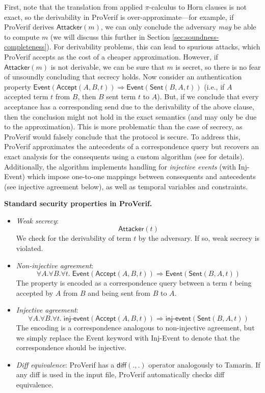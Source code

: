\documentclass{article}
\theoremstyle{definition}
\begin{document}
First, note that the translation from applied $\pi$-calculus to Horn clauses is not exact, so the derivability in ProVerif is over-approximate---for example, 
if ProVerif derives 
$\mathsf{Attacker}(m)$, we can only conclude the adversary \emph{may} be able to compute $m$
(we will discuss this further in Section \ref{sec:soundness-completeness}). 
For derivability problems, this can lead to spurious attacks, 
which ProVerif accepts as the cost of a cheaper approximation. 
However, if $\textsf{Attacker}(m)$ is not derivable, 
we can be sure that $m$ is secret, 
so there is no fear of unsoundly concluding that secrecy holds. 
Now consider an authentication property $\mathsf{Event}(\mathsf{Accept}(A, B, t)) \Rightarrow \mathsf{Event}(\mathsf{Sent}(B, A, t))$ 
(i.e., if $A$ accepted term $t$ from $B$, then $B$ sent term $t$ to $A$). 
But, if we conclude that every acceptance has a corresponding send due to the derivability of the above clause,
then the conclusion might not hold in the exact semantics (and may only be due to 
the approximation). 
This is more problematic than the case of secrecy, 
as ProVerif would falsely conclude that the protocol is secure.
To address this, ProVerif approximates the antecedents of a correspondence query 
but recovers an exact analysis for the consequents using a custom algorithm (see \cite{proverif_correspondences} for details). 
Additionally, the algorithm implements handling for \emph{injective events}
(with \textsf{Inj-Event})
which impose one-to-one mappings 
between consequents and antecedents (see injective agreement below), as well as temporal variables and constraints.


\textbf{Standard security properties in ProVerif.}
\begin{itemize}
    \item \emph{Weak secrecy}: $$\mathsf{Attacker}(t)$$
    We check for the derivability of term $t$ by the adversary. If so, weak secrecy is violated.
    \item \emph{Non-injective agreement}:
    $$\forall A. \forall B. \forall t.\; \mathsf{Event}(\mathsf{Accept}(A, B, t)) \Rightarrow \mathsf{Event}(\mathsf{Sent}(B, A, t))$$
    The property is encoded as a correspondence query between a term $t$ being accepted by $A$ from $B$ and being sent from $B$ to $A$.
    \item \emph{Injective agreement}: 
    $$\forall A. \forall B. \forall t.\; \textsf{inj-event}(\mathsf{Accept}(A, B, t)) \Rightarrow \textsf{inj-event}(\textsf{Sent}(B, A, t))$$
    The encoding is a correspondence analogous to non-injective agreement, but we simply replace the \textsf{Event} keyword with \textsf{Inj-Event} to denote that the correspondence should be injective.
    \item \emph{Diff equivalence}: ProVerif has a $\textsf{diff}(., .)$ operator analogously to Tamarin. If any \textsf{diff} is used in the input file, ProVerif automatically checks diff equivalence.
\end{itemize}
\end{document}
